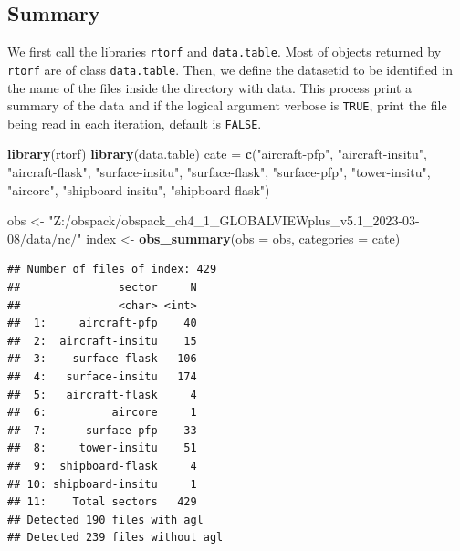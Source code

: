 \documentclass[10pt,a4paper,onecolumn]{article}
\newenvironment{Shaded}{\begin{snugshade}}{\end{snugshade}}
\newcommand{\AttributeTok}[1]{\textcolor[rgb]{0.13,0.29,0.53}{#1}}
\newcommand{\FunctionTok}[1]{\textcolor[rgb]{0.13,0.29,0.53}{\textbf{#1}}}
\newcommand{\NormalTok}[1]{#1}
\newcommand{\OtherTok}[1]{\textcolor[rgb]{0.56,0.35,0.01}{#1}}
\newcommand{\StringTok}[1]{\textcolor[rgb]{0.31,0.60,0.02}{#1}}
\begin{document}
\subsection{Summary}\label{summary-1}

We first call the libraries \texttt{rtorf} and \texttt{data.table}. Most
of objects returned by \texttt{rtorf} are of class \texttt{data.table}.
Then, we define the datasetid to be identified in the name of the files
inside the directory with data. This process print a summary of the data
and if the logical argument verbose is \texttt{TRUE}, print the file
being read in each iteration, default is \texttt{FALSE}.

\begin{Shaded}
\begin{Highlighting}[]
\FunctionTok{library}\NormalTok{(rtorf)}
\FunctionTok{library}\NormalTok{(data.table)}
\NormalTok{cate }\OtherTok{=} \FunctionTok{c}\NormalTok{(}\StringTok{"aircraft{-}pfp"}\NormalTok{,}
         \StringTok{"aircraft{-}insitu"}\NormalTok{,}
         \StringTok{"aircraft{-}flask"}\NormalTok{,}
         \StringTok{"surface{-}insitu"}\NormalTok{,}
         \StringTok{"surface{-}flask"}\NormalTok{, }
         \StringTok{"surface{-}pfp"}\NormalTok{,   }
         \StringTok{"tower{-}insitu"}\NormalTok{,  }
         \StringTok{"aircore"}\NormalTok{,       }
         \StringTok{"shipboard{-}insitu"}\NormalTok{,}
         \StringTok{"shipboard{-}flask"}\NormalTok{) }

\NormalTok{obs }\OtherTok{\textless{}{-}} \StringTok{"Z:/obspack/obspack\_ch4\_1\_GLOBALVIEWplus\_v5.1\_2023{-}03{-}08/data/nc/"}
\NormalTok{index }\OtherTok{\textless{}{-}} \FunctionTok{obs\_summary}\NormalTok{(}\AttributeTok{obs =}\NormalTok{ obs, }
                     \AttributeTok{categories =}\NormalTok{ cate)}
\end{Highlighting}
\end{Shaded}

\begin{verbatim}
## Number of files of index: 429
##               sector     N
##               <char> <int>
##  1:     aircraft-pfp    40
##  2:  aircraft-insitu    15
##  3:    surface-flask   106
##  4:   surface-insitu   174
##  5:   aircraft-flask     4
##  6:          aircore     1
##  7:      surface-pfp    33
##  8:     tower-insitu    51
##  9:  shipboard-flask     4
## 10: shipboard-insitu     1
## 11:    Total sectors   429
## Detected 190 files with agl
## Detected 239 files without agl
\end{verbatim}
\end{document}
